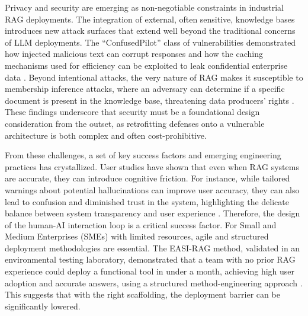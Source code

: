 \documentclass[11pt]{article}
\begin{document}
Privacy and security are emerging as non-negotiable constraints in industrial RAG deployments. The integration of external, often sensitive, knowledge bases introduces new attack surfaces that extend well beyond the traditional concerns of LLM deployments. The ``ConfusedPilot'' class of vulnerabilities demonstrated how injected malicious text can corrupt responses and how the caching mechanisms used for efficiency can be exploited to leak confidential enterprise data \cite{ref472}. Beyond intentional attacks, the very nature of RAG makes it susceptible to membership inference attacks, where an adversary can determine if a specific document is present in the knowledge base, threatening data producers' rights \cite{ref474,ref71}. These findings underscore that security must be a foundational design consideration from the outset, as retrofitting defenses onto a vulnerable architecture is both complex and often cost-prohibitive.

From these challenges, a set of key success factors and emerging engineering practices has crystallized. User studies have shown that even when RAG systems are accurate, they can introduce cognitive friction. For instance, while tailored warnings about potential hallucinations can improve user accuracy, they can also lead to confusion and diminished trust in the system, highlighting the delicate balance between system transparency and user experience \cite{ref595}. Therefore, the design of the human-AI interaction loop is a critical success factor. For Small and Medium Enterprises (SMEs) with limited resources, agile and structured deployment methodologies are essential. The EASI-RAG method, validated in an environmental testing laboratory, demonstrated that a team with no prior RAG experience could deploy a functional tool in under a month, achieving high user adoption and accurate answers, using a structured method-engineering approach \cite{ref568}. This suggests that with the right scaffolding, the deployment barrier can be significantly lowered.
\end{document}

